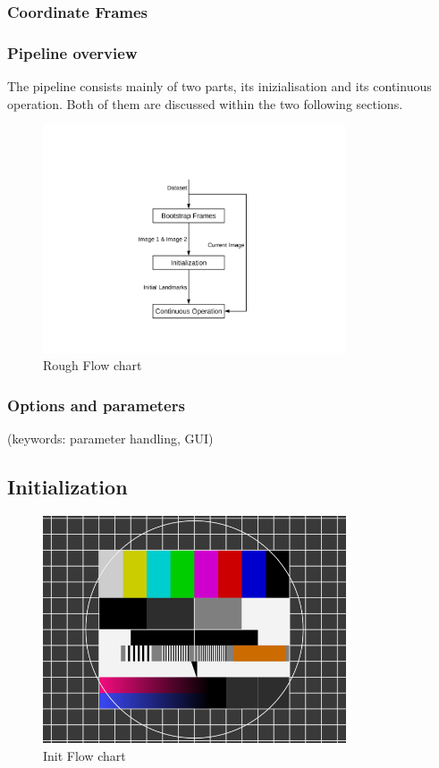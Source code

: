 \documentclass[a4paper,10pt]{article} %
\begin{document}
\subsubsection{Coordinate Frames}
\subsubsection{Pipeline overview}

The pipeline consists mainly of two parts, its inizialisation and its continuous operation. Both of them are discussed within the two following sections.

\begin{figure}[ht]
	\includegraphics[width=0.8\textwidth]{rough_flow2}
	\caption{Rough Flow chart}
	\label{img_flow_rough}
\end{figure}
%
\subsubsection{Options and parameters}
(keywords: parameter handling, GUI)



\subsection{Initialization}
\begin{figure}[ht]
	\includegraphics[width=0.8\textwidth]{test}
	\caption{Init Flow chart}
	\label{img_flow_init}
\end{figure}
\end{document}
